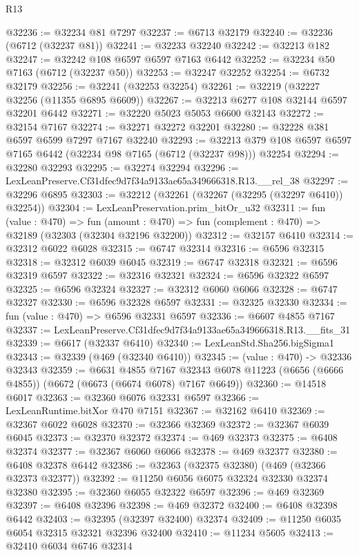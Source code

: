 \begin{lexlean}{R13}
\begin{coremodule}
@32236 := @32234 @81 @7297
@32237 := @6713 @32179
@32240 := @32236 (@6712 (@32237 @81))
@32241 := @32233 @32240
@32242 := @32213 @182
@32247 := @32242 @108 @6597 @6597 @7163 @6442
@32252 := @32234 @50 @7163 (@6712 (@32237 @50))
@32253 := @32247 @32252
@32254 := @6732 @32179
@32256 := @32241 (@32253 @32254)
@32261 := @32219 (@32227 @32256 (@11355 @6895 @6609))
@32267 := @32213 @6277 @108 @32144 @6597 @32201 @6442
@32271 := @32220 @5023 @5053 @6600 @32143
@32272 := @32154 @7167
@32274 := @32271 @32272 @32201
@32280 := @32228 @381 @6597 @6599 @7297 @7167 @32240
@32293 := @32213 @379 @108 @6597 @6597 @7165 @6442 (@32234 @98 @7165 (@6712 (@32237 @98))) @32254
@32294 := @32280 @32293
@32295 := @32274 @32294
@32296 := LexLeanPreserve.Cf31dfec9d7f34a9133ae65a349666318.R13.__rel_38
@32297 := @32296 @6895
@32303 := @32212 (@32261 (@32267 (@32295 (@32297 @6410)) @32254))
@32304 := LexLeanPreservation.prim_bitOr_u32
@32311 := fun (value : @470) =>
  fun (amount : @470) => fun (complement : @470) => @32189 (@32303 (@32304 @32196 @32200))
@32312 := @32157 @6410
@32314 := @32312 @6022 @6028
@32315 := @6747 @32314
@32316 := @6596 @32315
@32318 := @32312 @6039 @6045
@32319 := @6747 @32318
@32321 := @6596 @32319 @6597
@32322 := @32316 @32321
@32324 := @6596 @32322 @6597
@32325 := @6596 @32324
@32327 := @32312 @6060 @6066
@32328 := @6747 @32327
@32330 := @6596 @32328 @6597
@32331 := @32325 @32330
@32334 := fun (value : @470) => @6596 @32331 @6597
@32336 := @6607 @4855 @7167
@32337 := LexLeanPreserve.Cf31dfec9d7f34a9133ae65a349666318.R13.__fits_31
@32339 := @6617 (@32337 @6410)
@32340 := LexLeanStd.Sha256.bigSigma1
@32343 := @32339 (@469 (@32340 @6410))
@32345 := (value : @470) -> @32336 @32343
@32359 := @6631
    @4855
    @7167
    @32343
    @6078
    @11223
    (@6656 (@6666 @4855))
    (@6672 (@6673 (@6674 @6078) @7167 @6649))
@32360 := @14518 @6017
@32363 := @32360 @6076 @32331 @6597
@32366 := LexLeanRuntime.bitXor @470 @7151
@32367 := @32162 @6410
@32369 := @32367 @6022 @6028
@32370 := @32366 @32369
@32372 := @32367 @6039 @6045
@32373 := @32370 @32372
@32374 := @469 @32373
@32375 := @6408 @32374
@32377 := @32367 @6060 @6066
@32378 := @469 @32377
@32380 := @6408 @32378 @6442
@32386 := @32363 (@32375 @32380) (@469 (@32366 @32373 @32377))
@32392 := @11250 @6056 @6075 @32324 @32330 @32374 @32380
@32395 := @32360 @6055 @32322 @6597
@32396 := @469 @32369
@32397 := @6408 @32396
@32398 := @469 @32372
@32400 := @6408 @32398 @6442
@32403 := @32395 (@32397 @32400) @32374
@32409 := @11250 @6035 @6054 @32315 @32321 @32396 @32400
@32410 := @11234 @5605
@32413 := @32410 @6034 @6746 @32314

\end{coremodule}
\end{lexlean}
